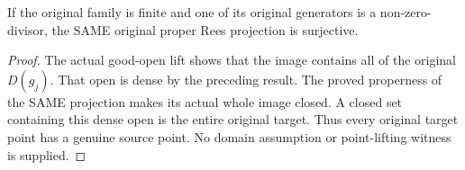 \begin{theorem}
\label{scheme:actual-rees-regular-center-surjective}
\leanok
{}
If the original family is finite and one of its original generators is
a non-zero-divisor, the SAME original proper Rees projection is surjective.
\end{theorem}
\begin{proof}
The actual good-open lift shows that the image contains all of the
original $D(g_j)$. That open is dense by the preceding result. The proved
properness of the SAME projection makes its actual whole image closed.
A closed set containing this dense open is the entire original target.
Thus every original target point has a genuine source point. No domain
assumption or point-lifting witness is supplied.
\end{proof}
